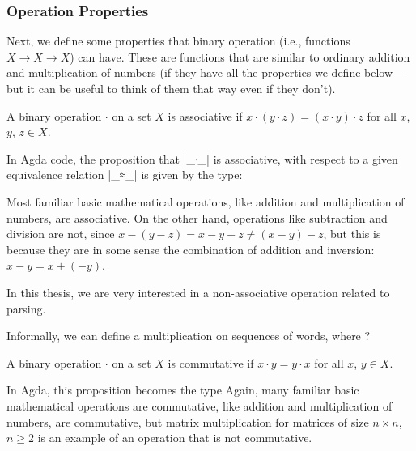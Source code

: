 

\subsubsection{Operation Properties}
Next, we define some properties that binary operation (i.e., functions $X \to X \to X$) can have. These are functions that are similar to ordinary addition and multiplication of numbers (if they have all the properties we define below---but it can be useful to think of them that way even if they don't).
\begin{Definition} %
A binary operation $\cdot$ on a set $X$ is associative if $x \cdot (y \cdot z) = (x \cdot y) \cdot z$ for all $x$, $y$, $z \in X$.
\end{Definition}
In Agda code, the proposition that |_∙_| is associative, with respect to a given equivalence relation |_≈_| is given by the type:

Most familiar basic mathematical operations, like addition and multiplication of numbers, are associative. On the other hand, operations like subtraction and division are not, since $x - (y - z) = x - y + z \ne (x - y) - z$, but this is because they are in some sense the combination of addition and inversion: $x - y = x + (-y)$. %

In this thesis, we are very interested in a non-associative operation related to parsing.
\begin{Example}
Informally, we can define a multiplication on sequences of words, where ? 
\end{Example}
\begin{Definition} %
A binary operation $\cdot$ on a set $X$ is commutative if $x \cdot y = y \cdot x$ for all $x$, $y \in X$.
\end{Definition}
In Agda, this proposition becomes the type
Again, many familiar basic mathematical operations are commutative, like addition and multiplication of numbers, are commutative, but matrix multiplication for matrices of size $n \times n$, $n \ge 2$ is an example of an operation that is not commutative.

